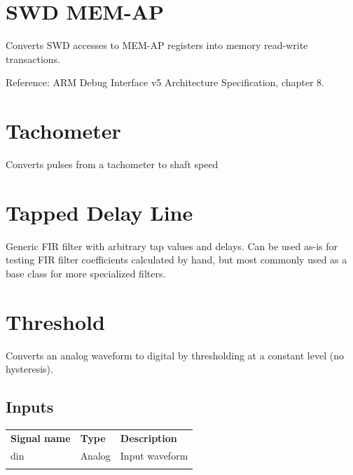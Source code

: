 

\pagebreak
\section{SWD MEM-AP}

Converts SWD accesses to MEM-AP registers into memory read-write transactions.

Reference: ARM Debug Interface v5 Architecture Specification, chapter 8.

\pagebreak
\section{Tachometer}

Converts pulses from a tachometer to shaft speed

\pagebreak
\section{Tapped Delay Line}

Generic FIR filter with arbitrary tap values and delays. Can be used as-is for testing FIR filter coefficients
calculated by hand, but most commonly used as a base class for more specialized filters.

\pagebreak
\section{Threshold}

Converts an analog waveform to digital by thresholding at a constant level (no hysteresis).

\subsection{Inputs}

\begin{tabularx}{16cm}{llX}
\thickhline
\textbf{Signal name} & \textbf{Type} & \textbf{Description} \\
\thickhline
din & Analog & Input waveform \\
\thickhline
\end{tabularx}


